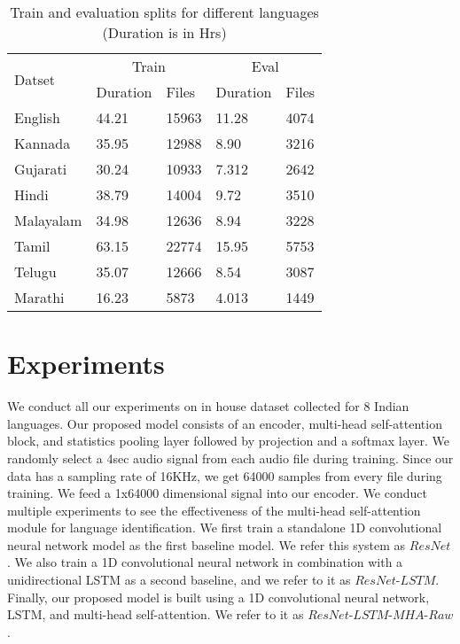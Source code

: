 \documentclass{article}
\begin{document}
\begin{table}
\centering
  \label{tab:tasks}
  
  \begin{adjustbox}{max width=\textwidth}
  \begin{tabular}{|l|l|l|l|l|}
    \hline
    \multirow{2}{*}{Datset} &
     \multicolumn{2}{c}{Train} &
     \multicolumn{2}{c}{Eval} \\
    & Duration & Files & Duration & Files\\
    \hline
    English & 44.21 & 15963 & 11.28 & 4074 \\
    \hline
    Kannada & 35.95 & 12988 & 8.90 & 3216 \\
    \hline
    Gujarati & 30.24 & 10933 & 7.312 & 2642 \\
    \hline
    Hindi & 38.79 & 14004 & 9.72 & 3510 \\
    \hline
    Malayalam & 34.98 & 12636 & 8.94 & 3228 \\
    \hline
    Tamil & 63.15 & 22774 & 15.95 & 5753 \\
    \hline
    Telugu & 35.07 & 12666 & 8.54 & 3087 \\
    \hline
    Marathi & 16.23 & 5873 & 4.013 & 1449 \\
    \hline
  \end{tabular}
  \end{adjustbox}
  \caption{Train and evaluation splits for different languages (Duration is in Hrs)}
\end{table}

\section{Experiments}
We conduct all our experiments on in house dataset collected for 8 Indian languages. Our proposed model consists of an encoder, multi-head self-attention block, and statistics pooling layer followed by projection and a softmax layer. We randomly select a 4sec audio signal from each audio file during training. Since our data has a sampling rate of 16KHz, we get 64000 samples from every file during training. We feed a 1x64000 dimensional signal into our encoder. We conduct multiple experiments to see the effectiveness of the multi-head self-attention module for language identification. We first train a standalone 1D convolutional neural network model as the first baseline model. We refer this system as $\textit{ResNet}$. We also train a 1D convolutional neural network in combination with a unidirectional LSTM as a second baseline, and we refer to it as $\textit{ResNet-LSTM}$. Finally, our proposed model is built using a 1D convolutional neural network, LSTM, and multi-head self-attention. We refer to it as $\textit{ResNet-LSTM-MHA-Raw}$.
\end{document}
